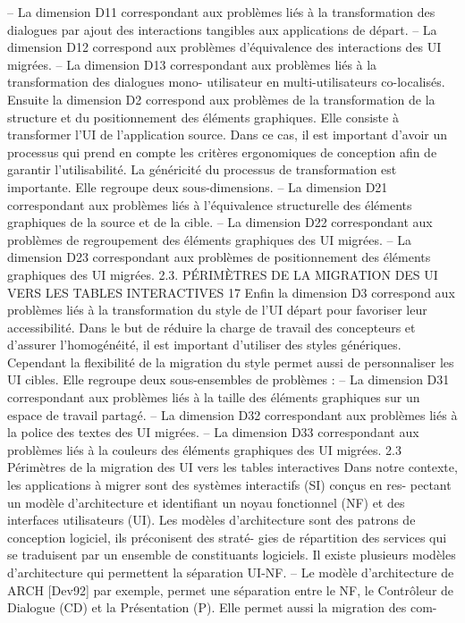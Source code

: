 \documentclass{article}
\begin{document}
– La dimension D11 correspondant aux problèmes liés à la transformation des dialogues par ajout
des interactions tangibles aux applications de départ.
– La dimension D12 correspond aux problèmes d’équivalence des interactions des UI migrées.
– La dimension D13 correspondant aux problèmes liés à la transformation des dialogues mono-
utilisateur en multi-utilisateurs co-localisés.
Ensuite la dimension D2 correspond aux problèmes de la transformation de la structure et du
positionnement des éléments graphiques. Elle consiste à transformer l’UI de l’application source.
Dans ce cas, il est important d’avoir un processus qui prend en compte les critères ergonomiques de
conception aﬁn de garantir l’utilisabilité. La généricité du processus de transformation est importante.
Elle regroupe deux sous-dimensions.
– La dimension D21 correspondant aux problèmes liés à l’équivalence structurelle des éléments
graphiques de la source et de la cible.
– La dimension D22 correspondant aux problèmes de regroupement des éléments graphiques
des UI migrées.
– La dimension D23 correspondant aux problèmes de positionnement des éléments graphiques
des UI migrées.
2.3. PÉRIMÈTRES DE LA MIGRATION DES UI VERS LES TABLES INTERACTIVES
17
Enﬁn la dimension D3 correspond aux problèmes liés à la transformation du style de l’UI départ
pour favoriser leur accessibilité. Dans le but de réduire la charge de travail des concepteurs et d’assurer
l’homogénéité, il est important d’utiliser des styles génériques. Cependant la ﬂexibilité de la migration
du style permet aussi de personnaliser les UI cibles. Elle regroupe deux sous-ensembles de problèmes :
– La dimension D31 correspondant aux problèmes liés à la taille des éléments graphiques sur un
espace de travail partagé.
– La dimension D32 correspondant aux problèmes liés à la police des textes des UI migrées.
– La dimension D33 correspondant aux problèmes liés à la couleurs des éléments graphiques des
UI migrées.
2.3
Périmètres de la migration des UI vers les tables interactives
Dans notre contexte, les applications à migrer sont des systèmes interactifs (SI) conçus en res-
pectant un modèle d’architecture et identiﬁant un noyau fonctionnel (NF) et des interfaces utilisateurs
(UI). Les modèles d’architecture sont des patrons de conception logiciel, ils préconisent des straté-
gies de répartition des services qui se traduisent par un ensemble de constituants logiciels. Il existe
plusieurs modèles d’architecture qui permettent la séparation UI-NF.
– Le modèle d’architecture de ARCH [Dev92] par exemple, permet une séparation entre le NF,
le Contrôleur de Dialogue (CD) et la Présentation (P). Elle permet aussi la migration des com-
\end{document}
